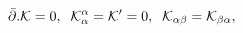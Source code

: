 \begin{equation}
\bar \partial. {\cal K}=0,\;\; {\cal K}_{\alpha}^{\alpha}={\cal
K}'=0,\;\; {\cal K}_{\alpha\beta}={\cal K}_{\beta\alpha},
\label{eq:con2}
\end{equation}

